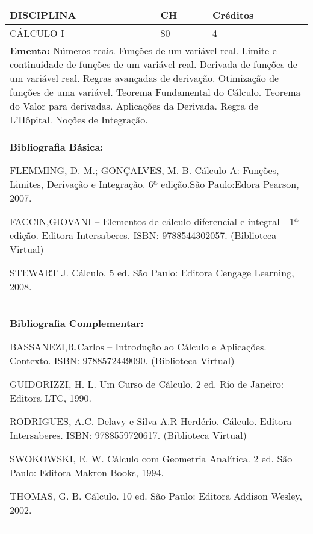 \documentclass[a4paper, 12pt, openright, oneside, german, french, english, brazil]{abntex2}
\begin{document}
\begin{table}[!h]
  \footnotesize
  \centering
  \begin{tabular}{|p{100mm}|p{10mm}|p{20mm}|}
    \hline
    \textbf{DISCIPLINA} & \textbf{CH} & \textbf{Créditos} \\
    \hline
    CÁLCULO I  & 80 & 4 \\
    \hline
    \multicolumn{3}{|p{130mm}|}{\textbf{Ementa:}  Números reais. Funções de um variável real. Limite e continuidade de funções de um variável real. Derivada de funções de um variável real. Regras avançadas de derivação. Otimização de funções de uma variável. Teorema Fundamental do Cálculo. Teorema do Valor para derivadas. Aplicações da Derivada. Regra de L’Hôpital. Noções de Integração.} \\
    \hline
    \multicolumn{3}{|p{130mm}|}{\textbf{Bibliografia Básica:}

    FLEMMING, D. M.; GONÇALVES, M. B. Cálculo A: Funções, Limites, Derivação e Integração. 6ª edição.São Paulo:Edora Pearson, 2007.

FACCIN,GIOVANI – Elementos de cálculo diferencial e integral - 1ª edição. Editora Intersaberes. ISBN: 9788544302057. (Biblioteca Virtual) 

STEWART J. Cálculo. 5 ed. São Paulo: Editora Cengage Learning, 2008.
} \\
    \hline
    \multicolumn{3}{|p{130mm}|}{\textbf{Bibliografia Complementar:}

    BASSANEZI,R.Carlos – Introdução ao Cálculo e Aplicações. Contexto. ISBN: 9788572449090. (Biblioteca Virtual) 

GUIDORIZZI, H. L. Um Curso de Cálculo. 2 ed. Rio de Janeiro: Editora LTC, 1990. 

RODRIGUES, A.C. Delavy e Silva A.R Herdério. Cálculo. Editora Intersaberes. ISBN: 9788559720617. (Biblioteca Virtual) 

SWOKOWSKI, E. W. Cálculo com Geometria Analítica. 2 ed. São Paulo: Editora Makron Books, 1994. 

THOMAS, G. B. Cálculo. 10 ed. São Paulo: Editora Addison Wesley, 2002.
} \\
    \hline
  \end{tabular}
\end{table}
\end{document}
